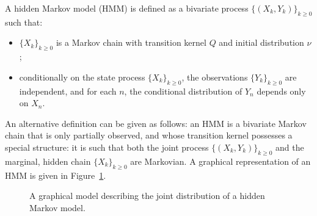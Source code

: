 \documentclass[english,graybox,envcountchap,envcountsame,sectrefs,shortlabels]{svmono}
\theoremstyle{style}
\begin{document}
A hidden Markov model (HMM) is defined as a bivariate process
$\{(X_k,Y_k)\}_{k\ge 0}$ such that:
\begin{itemize}
    \item $\{X_k\}_{k\ge 0}$ is a Markov chain with transition kernel $Q$ and
          initial distribution $\nu$;
    \item conditionally on the state process $\{X_k\}_{k\ge 0}$, the
          observations $\{Y_k\}_{k\ge 0}$ are independent, and for each $n$,
          the conditional distribution of $Y_n$ depends only on $X_n$.
\end{itemize}
An alternative definition can be given as follows: an HMM is a bivariate Markov
chain that is only partially observed, and whose transition kernel possesses a
special structure: it is such that both the joint process
$\{(X_k,Y_k)\}_{k\ge 0}$ and the marginal, hidden chain
$\{X_k\}_{k\ge 0}$ are Markovian. A graphical representation of an HMM is given in Figure~\ref{fig:hmm}.






\begin{figure}
\label{fig:hmm}
\centering
\caption{A graphical model describing the joint distribution of a hidden Markov model.}
\end{figure}
\end{document}
